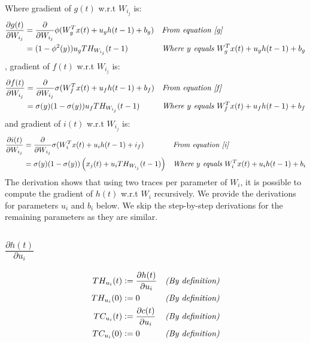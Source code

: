 \documentclass[twoside,11pt]{article}
\begin{document}
Where gradient of $g(t)$  w.r.t $W_{i_j}$ is:
\begin{align*}
\frac{\partial g(t)}{\partial W_{i_j}} &=  \frac{\partial}{\partial W_{i_j}} \phi(W_{g}^T x(t) + u_{g} h(t-1) + b_g) && \textit{From equation \ref{g}} \\
&= (1-\phi^2(y))u_g TH_{W_{i_j}}(t-1) && \textit{Where $y$ equals $W_{g}^T x(t) + u_{g} h(t-1) + b_g$} \\
\end{align*}
, gradient of $f(t)$  w.r.t $W_{i_j}$ is:
\begin{align*}
\frac{\partial f(t)}{\partial W_{i_j}} &=  \frac{\partial}{\partial W_{i_j}} \sigma(W_{f}^T x(t) + u_{f} h(t-1) + b_f) && \textit{From equation \ref{f}} \\
&= \sigma(y)(1-\sigma(y))u_f TH_{W_{i_j}}(t-1) && \textit{Where $y$ equals $W_{f}^T x(t) + u_{f} h(t-1) + b_f$} \\
\end{align*}
and gradient of $i(t)$ w.r.t $W_{i_j}$ is:
\begin{align*}
\frac{\partial i(t)}{\partial W_{i_j}} &=  \frac{\partial}{\partial W_{i_j}} \sigma(W_{i}^T x(t) + u_{i} h(t-1) + i_f) && \textit{From equation \ref{i}} \\
&= \sigma(y)(1-\sigma(y)) \left (x_j(t)+ u_i TH_{W_{i_j}}(t-1) \right )&& \textit{Where $y$ equals $W_{i}^T x(t) + u_{i} h(t-1) + b_i$} \\
\end{align*}
The derivation shows that using two traces per parameter of $W_i$, it is possible to compute the gradient of $h(t)$ w.r.t $W_i$ recursively. We provide the derivations for parameters $u_i$ and $b_i$ below. We skip the step-by-step derivations for the remaining parameters as they are similar. 

\subsection{$\frac{\partial h(t)}{\partial u_i}$}

\begin{align}
TH_{u_{i}}(t)  & \vcentcolon = \frac{\partial h(t)}{\partial u_i}  && \textit{(By definition)}  \label{thu}\\
TH_{u_{i}}(0)  & \vcentcolon = 0  && \textit{(By definition)}  \\
TC_{u_{i}}(t)  & \vcentcolon = \frac{\partial c(t)}{\partial u_i}  && \textit{(By definition)}  \label{tcu} \\
TC_{u_{i}}(0)  & \vcentcolon = 0  && \textit{(By definition)} 
\end{align}
\end{document}
